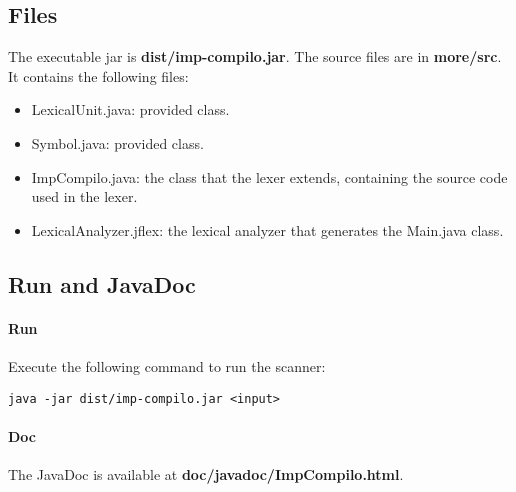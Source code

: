 \documentclass[letterpaper]{article}
\begin{document}
\subsection{Files}

The executable jar is \textbf{dist/imp-compilo.jar}.
The source files are in \textbf{more/src}. It contains the following files:

\begin{itemize}
    \item LexicalUnit.java: provided class.
    \item Symbol.java: provided class.
    \item ImpCompilo.java: the class that the lexer extends, containing the
    source code used in the lexer.
    \item LexicalAnalyzer.jflex: the lexical analyzer that generates the
    Main.java class.
\end{itemize}

\subsection{Run and JavaDoc}

\paragraph{Run}
Execute the following command to run the scanner:
\begin{lstlisting}[frame=single]
java -jar dist/imp-compilo.jar <input>
\end{lstlisting}
\paragraph{Doc}

The JavaDoc is available at \textbf{doc/javadoc/ImpCompilo.html}.
\end{document}
